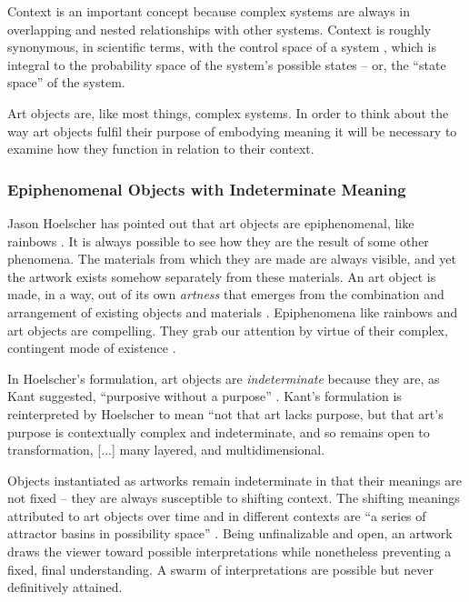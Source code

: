 \documentclass[letterpaper]{article}
\begin{document}
    Context is an important concept because complex systems are always in overlapping and nested relationships with other systems. Context is roughly synonymous, in scientific terms, with the control space of a system \citep[p.130]{DeLandaAssmblgThry2016}, which is integral to the probability space of the system's possible states – or, the “state space” of the system.
    
    Art objects are, like most things, complex systems. In order to think about the way art objects fulfil their purpose of embodying meaning it will be necessary to examine how they function in relation to their context.
    
    \subsubsection{Epiphenomenal Objects with Indeterminate Meaning}

    Jason Hoelscher has pointed out that art objects are epiphenomenal, like rainbows \citep[p.17]{HoelscherArtAsInfrmtn2021}. It is always possible to see how they are the result of some other phenomena. The materials from which they are made are always visible, and yet the artwork exists somehow separately from these materials. An art object is made, in a way, out of its own \emph{artness} that emerges from the combination and arrangement of existing objects and materials \citep[p.2]{HoelscherThPtcsOfPhsSpc2014}. Epiphenomena like rainbows and art objects are compelling. They grab our attention by virtue of their complex, contingent mode of existence \citep[p.18]{HoelscherThPtcsOfPhsSpc2014}. 
    
    In Hoelscher's formulation, art objects are \emph{indeterminate} because they are, as Kant suggested, “purposive without a purpose” \citep[p.57]{KantCrtqOfJdgmnt}. Kant's formulation is reinterpreted by Hoelscher to mean “not that art lacks purpose, but that art's purpose is contextually complex and indeterminate, and so remains open to transformation, [...] many layered, and multidimensional.\citep[p.25]{HoelscherThPtcsOfPhsSpc2014}

    Objects instantiated as artworks remain indeterminate in that their meanings are not fixed – they are always susceptible to shifting context. The shifting meanings attributed to art objects over time and in different contexts are “a series of attractor basins in possibility space” \citep[p.4]{HoelscherThPtcsOfPhsSpc2014}. Being unfinalizable and open, an artwork draws the viewer toward possible interpretations while nonetheless preventing a fixed, final understanding. A swarm of interpretations are possible but never definitively attained. \citep[p.12]{HoelscherThPtcsOfPhsSpc2014}
\end{document}
